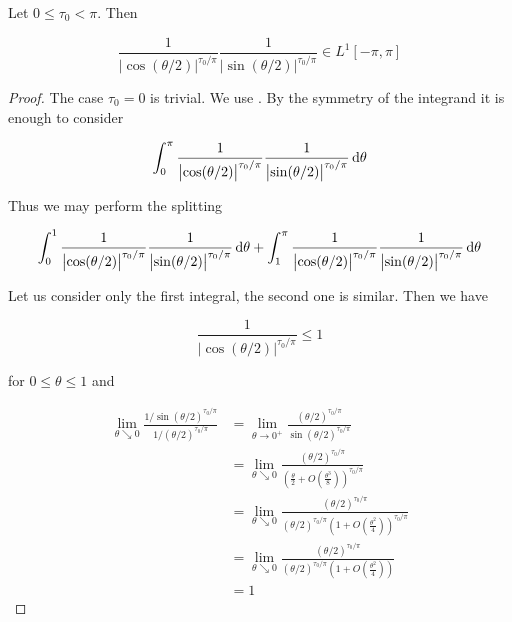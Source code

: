 \begin{lemma}
	Let $0 \leq \tau_0 < \pi$. Then 

	\begin{equation*}
		\frac{1}{\left| \cos(\theta/2) \right|^{\tau_0/\pi}}\frac{1}{\left| \sin(\theta/2) \right|^{\tau_0/\pi}} \in L^1[-\pi,\pi]
	\end{equation*}
\end{lemma}

\begin{proof}
	The case $\tau_0 = 0$ is trivial. We use \cite[153--154]{elstrodt:mass:2011}. By the symmetry of the integrand it is enough to consider 

	\begin{equation*}
		\int_{0}^\pi \frac{1}{\left| \cos(\theta/2) \right|^{\tau_0/\pi}}\frac{1}{\left| \sin(\theta/2) \right|^{\tau_0/\pi}} \mathop{}\!\mathrm{d} \theta
	\end{equation*}

	Thus we may perform the splitting 
	
	\begin{equation*}
		\int_{0}^1 \frac{1}{\left| \cos(\theta/2) \right|^{\tau_0/\pi}}\frac{1}{\left| \sin(\theta/2) \right|^{\tau_0/\pi}} \mathop{}\!\mathrm{d} \theta + \int_{1}^\pi \frac{1}{\left| \cos(\theta/2) \right|^{\tau_0/\pi}}\frac{1}{\left| \sin(\theta/2) \right|^{\tau_0/\pi}} \mathop{}\!\mathrm{d}\theta
	\end{equation*}
	
	Let us consider only the first integral, the second one is similar. Then we have 
	
	\begin{equation*}
		\frac{1}{\left| \cos(\theta/2) \right|^{\tau_0/\pi}} \leq 1 	\end{equation*}
	
	\noindent for $0 \leq \theta \leq 1$ and 
	
	\begin{equation*}
		\begin{aligned}
			\lim_{\theta \searrow 0}\frac{1/\sin(\theta/2)^{\tau_0/\pi}}{1/(\theta/2)^{\tau_0/\pi}} &=\lim_{\theta \to 0^+} \frac{(\theta/2)^{\tau_0/\pi}}{\sin(\theta/2)^{\tau_0/\pi}}\\ 
			&= \lim_{\theta \searrow 0} \frac{(\theta/2)^{\tau_0/\pi}}{\left(\frac{\theta}{2} + O\left(\frac{\theta^3}{8}\right)\right)^{\tau_0/\pi}}\\
			&= \lim_{\theta \searrow 0} \frac{(\theta/2)^{\tau_0/\pi}}{(\theta/2)^{\tau_0/\pi}\left(1 + O\left(\frac{\theta^2}{4}\right)\right)^{\tau_0/\pi}}\\ 
			&= \lim_{\theta \searrow 0} \frac{(\theta/2)^{\tau_0/\pi}}{(\theta/2)^{\tau_0/\pi}\left(1 + O\left(\frac{\theta^2}{4}\right)\right)}\\ 
			&= 1 
		\end{aligned}
	\end{equation*} 
	

\end{proof}
